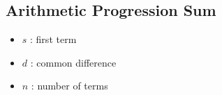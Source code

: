 \subsection{Arithmetic Progression Sum}
\begin{itemize}
  \item $s$ : first term
  \item $d$ : common difference
  \item $n$ : number of terms
\end{itemize}
